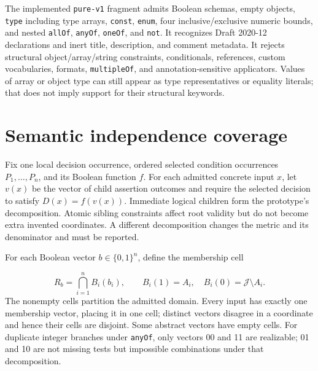 \documentclass[sigconf,nonacm]{acmart}
\begin{document}
The implemented \texttt{p\allowbreak{}u\allowbreak{}r\allowbreak{}e\allowbreak{}-\allowbreak{}v\allowbreak{}1} fragment admits Boolean schemas, empty objects, \texttt{t\allowbreak{}y\allowbreak{}p\allowbreak{}e} including type arrays, \texttt{c\allowbreak{}o\allowbreak{}n\allowbreak{}s\allowbreak{}t}, \texttt{e\allowbreak{}n\allowbreak{}u\allowbreak{}m}, four inclusive/exclusive numeric bounds, and nested \texttt{a\allowbreak{}l\allowbreak{}l\allowbreak{}O\allowbreak{}f}, \texttt{a\allowbreak{}n\allowbreak{}y\allowbreak{}O\allowbreak{}f}, \texttt{o\allowbreak{}n\allowbreak{}e\allowbreak{}O\allowbreak{}f}, and \texttt{n\allowbreak{}o\allowbreak{}t}. It recognizes Draft 2020-12 declarations and inert title, description, and comment metadata. It rejects structural object/array/string constraints, conditionals, references, custom vocabularies, formats, \texttt{m\allowbreak{}u\allowbreak{}l\allowbreak{}t\allowbreak{}i\allowbreak{}p\allowbreak{}l\allowbreak{}e\allowbreak{}O\allowbreak{}f}, and annotation-sensitive applicators. Values of array or object type can still appear as type representatives or equality literals; that does not imply support for their structural keywords.

\section{Semantic independence coverage}
Fix one local decision occurrence, ordered selected condition occurrences $P_1,\ldots,P_n$, and its Boolean function $f$. For each admitted concrete input $x$, let $v(x)$ be the vector of child assertion outcomes and require the selected decision to satisfy $D(x)=f(v(x))$. Immediate logical children form the prototype's decomposition. Atomic sibling constraints affect root validity but do not become extra invented coordinates. A different decomposition changes the metric and its denominator and must be reported.

For each Boolean vector $b\in\{0,1\}^n$, define the membership cell

\[
R_b=\bigcap_{i=1}^n B_i(b_i),\qquad
B_i(1)=A_i,\quad B_i(0)=\mathcal{J}\setminus A_i.
\]
The nonempty cells partition the admitted domain. Every input has exactly one membership vector, placing it in one cell; distinct vectors disagree in a coordinate and hence their cells are disjoint. Some abstract vectors have empty cells. For duplicate integer branches under \texttt{a\allowbreak{}n\allowbreak{}y\allowbreak{}O\allowbreak{}f}, only vectors 00 and 11 are realizable; 01 and 10 are not missing tests but impossible combinations under that decomposition.
\end{document}
